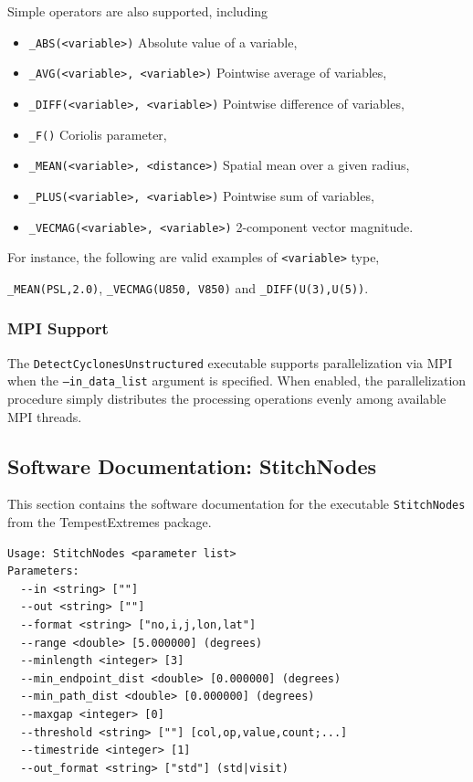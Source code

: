 \documentclass[gmdd, hvmath, online]{copernicus_discussions}
\begin{document}
Simple operators are also supported, including
\begin{itemize}
\item[] \texttt{\_ABS(<variable>)} Absolute value of a variable,
\item[] \texttt{\_AVG(<variable>, <variable>)} Pointwise average of variables,
\item[] \texttt{\_DIFF(<variable>, <variable>)} Pointwise difference of variables,
\item[] \texttt{\_F()}  Coriolis parameter,
\item[] \texttt{\_MEAN(<variable>, <distance>)} Spatial mean over a given radius,
\item[] \texttt{\_PLUS(<variable>, <variable>)} Pointwise sum of variables,
\item[] \texttt{\_VECMAG(<variable>, <variable>)} 2-component vector magnitude.
\end{itemize}  For instance, the following are valid examples of \texttt{<variable>} type,
\begin{center}
\texttt{\_MEAN(PSL,2.0)}, \quad \texttt{\_VECMAG(U850, V850)} \quad and \quad \texttt{\_DIFF(U(3),U(5))}.
\end{center}

\subsubsection{MPI Support} \label{sec:VariableSpecification}

The \texttt{DetectCyclonesUnstructured} executable supports parallelization via MPI when the \texttt{--in\_data\_list} argument is specified.  When enabled, the parallelization procedure simply distributes the processing operations evenly among available MPI threads.

\subsection{Software Documentation: StitchNodes} \label{sec:StitchNodesAppendix}

This section contains the software documentation for the executable \texttt{StitchNodes} from the TempestExtremes package.

{\small
\begin{verbatim}
Usage: StitchNodes <parameter list>
Parameters:
  --in <string> [""] 
  --out <string> [""] 
  --format <string> ["no,i,j,lon,lat"] 
  --range <double> [5.000000] (degrees)
  --minlength <integer> [3] 
  --min_endpoint_dist <double> [0.000000] (degrees)
  --min_path_dist <double> [0.000000] (degrees)
  --maxgap <integer> [0] 
  --threshold <string> [""] [col,op,value,count;...]
  --timestride <integer> [1] 
  --out_format <string> ["std"] (std|visit)
\end{verbatim}
}
\end{document}
